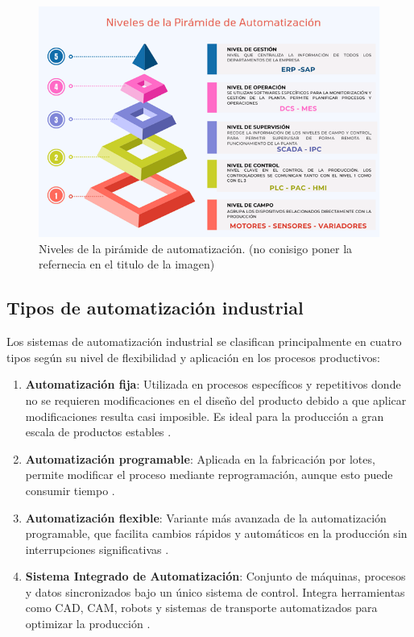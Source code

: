 \begin{figure} [h!]
  \begin{center}
    \includegraphics[width=16cm]{figs/esquema_automatizacion}
  \end{center}
  \caption{\centering Niveles de la pirámide de automatización. (no conisigo poner la refernecia en el titulo de la imagen)}  
  \label{fig:esquema_automatizacion}
\end{figure}  



\subsection{Tipos de automatización industrial}

Los sistemas de automatización industrial se clasifican principalmente en cuatro tipos según su nivel de flexibilidad y aplicación en los procesos productivos:

\begin{enumerate}
    \item \textbf{Automatización fija}: Utilizada en procesos específicos y repetitivos donde no se requieren modificaciones en el diseño del producto debido a que aplicar modificaciones resulta casi imposible. Es ideal para la producción a gran escala de productos estables \cite{tipos_industrial}.
    \item \textbf{Automatización programable}: Aplicada en la fabricación por lotes, permite modificar el proceso mediante reprogramación, aunque esto puede consumir tiempo \cite{tipos_industrial}.
    \item \textbf{Automatización flexible}: Variante más avanzada de la automatización programable, que facilita cambios rápidos y automáticos en la producción sin interrupciones significativas \cite{tipos_industrial}.
    \item \textbf{Sistema Integrado de Automatización}: Conjunto de máquinas, procesos y datos sincronizados bajo un único sistema de control. Integra herramientas como CAD, CAM, robots y sistemas de transporte automatizados para optimizar la producción \cite{tipos_industrial}.
\end{enumerate}

